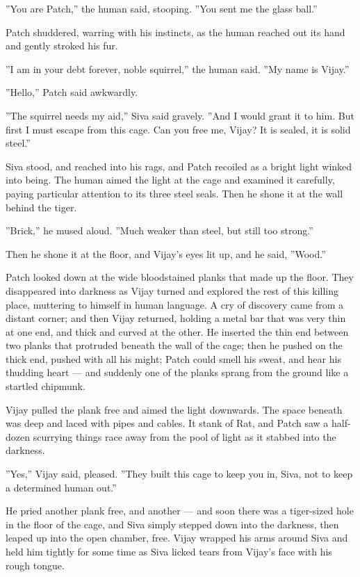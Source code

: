\documentclass[12pt]{book}
\begin{document}
''You are Patch,'' the human said, stooping. ''You sent me the glass ball.''

Patch shuddered, warring with his instincts, as the human reached out its hand and gently stroked his fur.

''I am in your debt forever, noble squirrel,'' the human said. ''My name is Vijay.''

''Hello,'' Patch said awkwardly.

''The squirrel needs my aid,'' Siva said gravely. ''And I would grant it to him. But first I must escape from this cage. Can you free me, Vijay? It is sealed, it is solid steel.''

Siva stood, and reached into his rags, and Patch recoiled as a bright light winked into being. The human aimed the light at the cage and examined it carefully, paying particular attention to its three steel seals. Then he shone it at the wall behind the tiger.

''Brick,'' he mused aloud. ''Much weaker than steel, but still too strong.''

Then he shone it at the floor, and Vijay's eyes lit up, and he said, ''Wood.''

Patch looked down at the wide bloodstained planks that made up the floor. They disappeared into darkness as Vijay turned and explored the rest of this killing place, muttering to himself in human language. A cry of discovery came from a distant corner; and then Vijay returned, holding a metal bar that was very thin at one end, and thick and curved at the other. He inserted the thin end between two planks that protruded beneath the wall of the cage; then he pushed on the thick end, pushed with all his might; Patch could smell his sweat, and hear his thudding heart ---
and suddenly one of the planks sprang from the ground like a startled chipmunk.

Vijay pulled the plank free and aimed the light downwards. The space beneath was deep and laced with pipes and cables. It stank of Rat, and Patch saw a half-dozen scurrying things race away from the pool of light as it stabbed into the darkness.

''Yes,'' Vijay said, pleased. ''They built this cage to keep you in, Siva, not to keep a determined human out.''

He pried another plank free, and another ---
and soon there was a tiger-sized hole in the floor of the cage, and Siva simply stepped down into the darkness, then leaped up into the open chamber, free. Vijay wrapped his arms around Siva and held him tightly for some time as Siva licked tears from Vijay's face with his rough tongue.
\end{document}
